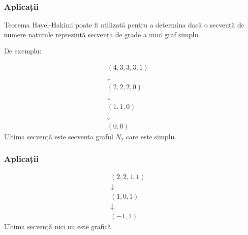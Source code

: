 \begin{frame}
  \frametitle{Aplicații}

Teorema Havel-Hakimi poate fi utilizată pentru a determina dacă o secvență de numere naturale reprezintă secvența de grade a unui graf simplu.

De exemplu:

\begin{minipage}{0.49\textwidth}
\[
  \begin{array}{c}
    (4,3,3,3,1)\\
    \downarrow\\
    (2,2,2,0)\\
    \downarrow\\
    (1,1,0)\\
    \downarrow\\
    (0,0)
  \end{array}
\]
Ultima secvență este secvența graful $N_2$ care este simplu.
\end{minipage}
%
\begin{minipage}{0.49\textwidth}
\begin{figure}
\centering%
\end{figure}
\end{minipage}

\end{frame}

\begin{frame}
  \frametitle{Aplicații}

\begin{minipage}{0.49\textwidth}
\[
  \begin{array}{c}
    (2,2,1,1)\\
    \downarrow\\
    (1,0,1)\\
    \downarrow\\
    (-1,1)
  \end{array}
\]
Ultima secvență nici nu este grafică.
\end{minipage}
%
\begin{minipage}{0.49\textwidth}
\begin{figure}
\centering%
\end{figure}
\end{minipage}

\end{frame}


